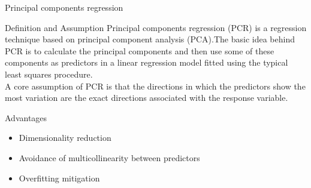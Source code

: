 \documentclass[10pt]{beamer}
\begin{document}
\begin{frame}[fragile]{Principal components regression}
\begin{block}{Definition and Assumption}
Principal components regression (PCR) is a regression technique based on principal component analysis (PCA).The basic idea behind PCR is to calculate the principal components and then use some of these components as predictors in a linear regression model fitted using the typical least squares procedure.\\
A core assumption of PCR is that the directions in which the predictors show the most variation are the exact directions associated with the response variable.
\end{block}
\begin{block}{Advantages}
\begin{itemize}
\item Dimensionality reduction
\item Avoidance of multicollinearity between predictors
\item Overfitting mitigation
\end{itemize}
\end{block}
\end{frame}
\end{document}
